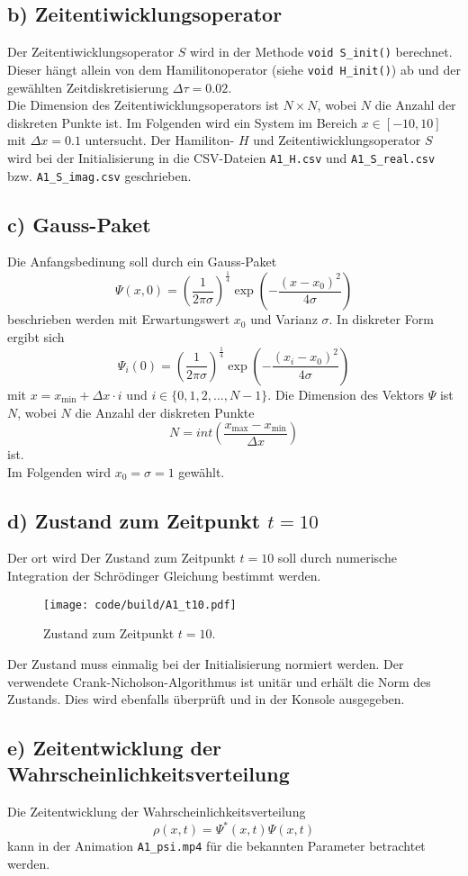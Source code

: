 \subsection{b) Zeitentiwicklungsoperator}
Der Zeitentiwicklungsoperator $S$ wird in der Methode \texttt{void S\_init()} berechnet.
Dieser hängt allein von dem Hamilitonoperator (siehe \texttt{void H\_init()}) ab und der gewählten Zeitdiskretisierung $\Delta \tau = 0.02$.
\\
Die Dimension des Zeitentiwicklungsoperators ist $N \times N$, wobei $N$ die Anzahl der diskreten Punkte ist.
Im Folgenden wird ein System im Bereich $x \in [-10,10]$ mit $\Delta x = 0.1$ untersucht.
Der Hamiliton- $H$ und Zeitentiwicklungsoperator $S$ wird bei der Initialisierung in die CSV-Dateien \texttt{A1\_H.csv} und \texttt{A1\_S\_real.csv} bzw. \texttt{A1\_S\_imag.csv} geschrieben.

\subsection{c) Gauss-Paket}
Die Anfangsbedinung soll durch ein Gauss-Paket
\begin{equation}
    \Psi(x,0) = \left( \frac{1}{2 \pi \sigma} \right)^{\frac{1}{4}} \exp \left( - \frac{(x - x_0)^2}{4 \sigma}\right)
\end{equation}
beschrieben werden mit Erwartungswert $x_0$ und Varianz $\sigma$.
In diskreter Form ergibt sich
\begin{equation}
    \Psi_i(0) = \left( \frac{1}{2 \pi \sigma} \right)^{\frac{1}{4}} \exp \left( - \frac{(x_i - x_0)^2}{4 \sigma}\right)
\end{equation}
mit $x = x_\text{min} + \Delta x \cdot i$ und $i \in \{0,1,2,...,N-1\}$.
Die Dimension des Vektors $\Psi$ ist $N$, wobei $N$ die Anzahl der diskreten Punkte
\begin{equation}
    N = int (\frac{x_\text{max} - x_\text{min}}{\Delta x})
\end{equation}
ist.
\\
Im Folgenden wird $x_0 = \sigma = 1$ gewählt.
\FloatBarrier

\subsection{d) Zustand zum Zeitpunkt $t=10$}
Der ort wird
Der Zustand zum Zeitpunkt $t=10$ soll durch numerische Integration der Schrödinger Gleichung bestimmt werden.
\begin{figure}
    \centering
    \texttt{[image: code/build/A1\_t10.pdf]}
    \caption{Zustand zum Zeitpunkt $t=10$.}
\end{figure}
Der Zustand muss einmalig bei der Initialisierung normiert werden.
Der verwendete Crank-Nicholson-Algorithmus ist unitär und erhält die Norm des Zustands.
Dies wird ebenfalls überprüft und in der Konsole ausgegeben.
\FloatBarrier

\subsection{e) Zeitentwicklung der Wahrscheinlichkeitsverteilung}
Die Zeitentwicklung der Wahrscheinlichkeitsverteilung
\begin{equation}
    \rho(x,t) = \Psi^*(x,t) \Psi(x,t)
\end{equation}
kann in der Animation \texttt{A1\_psi.mp4} für die bekannten Parameter betrachtet werden.